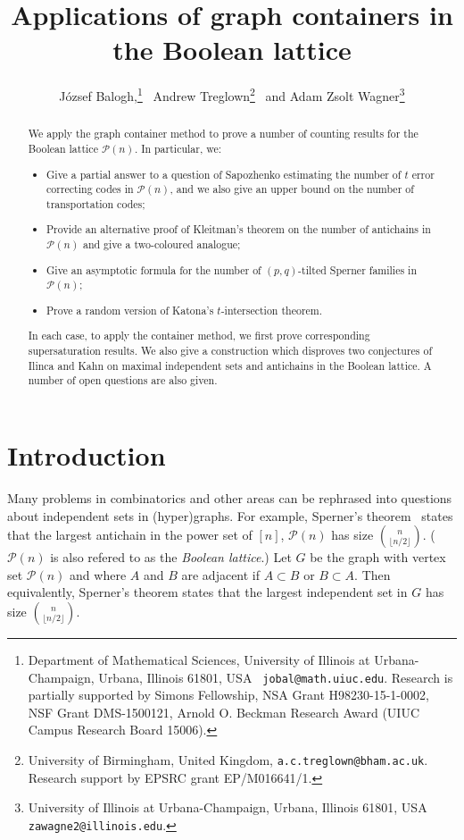 \documentclass[11pt]{article}
\title{Applications of graph containers in the Boolean lattice}
\author{J\'ozsef Balogh,\footnote{Department of Mathematical Sciences,
 University of Illinois at Urbana-Champaign, Urbana, Illinois 61801, USA {\tt
jobal@math.uiuc.edu}. Research is partially supported by Simons Fellowship, NSA Grant H98230-15-1-0002, NSF
 Grant DMS-1500121, Arnold O. Beckman Research Award (UIUC Campus Research Board 15006).}
\   Andrew Treglown\footnote{University of Birmingham, United Kingdom, {\tt a.c.treglown@bham.ac.uk}. Research support by EPSRC grant EP/M016641/1.}
\ and Adam Zsolt Wagner\footnote{University of Illinois at Urbana-Champaign, Urbana, Illinois 61801, USA {\tt
zawagne2@illinois.edu}. }}
\numberwithin{equation}{section}
\def\COMMENT#1{}
\begin{document}
 \maketitle
\begin{abstract}
We apply the graph container method to prove a number of counting results for the Boolean lattice $\mathcal P(n)$. In particular, we: 
\begin{itemize}
\item[(i)] Give a partial answer to a question of Sapozhenko estimating the number of $t$ error correcting codes  in $\mathcal P(n)$, and we also give an upper bound on the number of transportation codes;
\item[(ii)] Provide an alternative proof of Kleitman's theorem on the number of antichains in $\mathcal P(n)$ and  give a two-coloured analogue;
\item[(iii)] Give an asymptotic formula for the number of $(p,q)$-tilted Sperner families in $\mathcal P(n)$;
\item[(iv)] Prove a random version of Katona's $t$-intersection theorem.
\end{itemize}
In each case, to apply the container method, we first prove corresponding supersaturation results.
We also give a construction which disproves two conjectures of Ilinca and Kahn on maximal independent sets and antichains in the Boolean lattice.
 A number of open questions are also given.
\end{abstract}
\COMMENT{AT: all logs base 2? - AZW: think so.}
\section{Introduction}
Many problems in combinatorics and other areas can be rephrased into questions about independent sets in (hyper)graphs.
For example, Sperner's theorem~\cite{sperner} states that the largest antichain in the power set of $[n]$, $\mathcal P(n)$ has size $\binom{n}{\lfloor  n/2\rfloor}$. ($\mathcal P(n)$ is also refered to as the \emph{Boolean lattice}.)
Let $G$ be the graph with vertex set $\mathcal P(n)$ and where $A$ and $B$ are adjacent if $A\subset B$ or $B \subset A$. Then equivalently, Sperner's theorem states that the largest independent set in $G$ has size $\binom{n}{\lfloor  n/2\rfloor}$.
\end{document}
